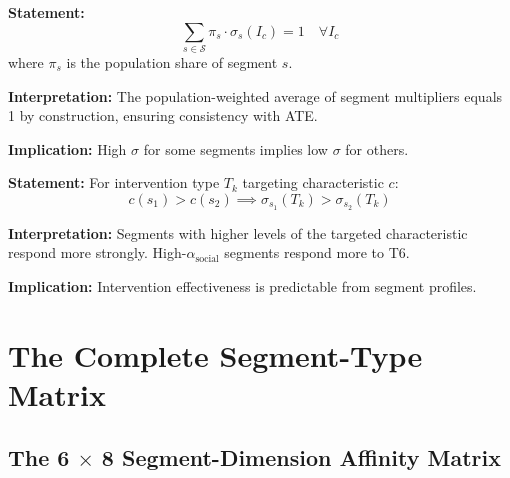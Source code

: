 \begin{tcolorbox}[colback=gray!5!white, colframe=gray!75!black,
    title=Axiom QQ-4: Weighted Average Consistency]
\textbf{Statement:}
\begin{equation}
\sum_{s \in \mathcal{S}} \pi_s \cdot \sigma_s(I_c) = 1 \quad \forall I_c
\end{equation}
where $\pi_s$ is the population share of segment $s$.

\textbf{Interpretation:} The population-weighted average of segment multipliers
equals 1 by construction, ensuring consistency with ATE.

\textbf{Implication:} High $\sigma$ for some segments implies low $\sigma$ for others.
\end{tcolorbox}

\begin{tcolorbox}[colback=gray!5!white, colframe=gray!75!black,
    title=Axiom QQ-5: Monotonicity in Segment Characteristic]
\textbf{Statement:} For intervention type $T_k$ targeting characteristic $c$:
\begin{equation}
c(s_1) > c(s_2) \implies \sigma_{s_1}(T_k) > \sigma_{s_2}(T_k)
\end{equation}

\textbf{Interpretation:} Segments with higher levels of the targeted characteristic
respond more strongly. High-$\alpha_{\text{social}}$ segments respond more to T6.

\textbf{Implication:} Intervention effectiveness is predictable from segment profiles.
\end{tcolorbox}


\section{The Complete Segment-Type Matrix}
\label{sec:qq-matrix}

\subsection{The 6 $\times$ 8 Segment-Dimension Affinity Matrix}

